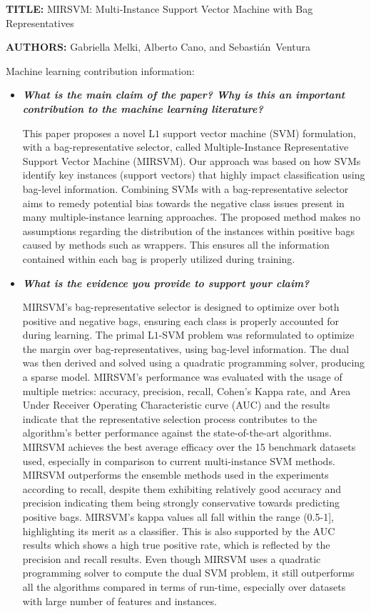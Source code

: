 \documentclass[a4paper,notitlepage]{article}
\begin{document}
\noindent \textbf{\small TITLE:} {\small MIRSVM: Multi-Instance Support Vector Machine with Bag Representatives}

\noindent \textbf{\small AUTHORS:} {\small Gabriella Melki, Alberto Cano, and Sebasti\'{a}n~Ventura}

\bigskip

\noindent Machine learning contribution information:

\begin{itemize}
\item \textbf{\textit{What is the main claim of the paper? Why is this an important contribution to the machine learning literature?}}

This paper proposes a novel L$1$ support vector machine (SVM) formulation, with a bag-representative selector, called Multiple-Instance Representative Support Vector Machine (MIRSVM). Our approach was based on how SVMs identify key instances (support vectors) that highly impact classification using bag-level information. Combining SVMs with a bag-representative selector aims to remedy potential bias towards the negative class issues present in many multiple-instance learning approaches. The proposed method makes no assumptions regarding the distribution of the instances within positive bags caused by methods such as wrappers. This ensures all the information contained within each bag is properly utilized during training.

\item \textbf{\textit{What is the evidence you provide to support your claim?}}

MIRSVM's bag-representative selector is designed to optimize over both positive and negative bags, ensuring each class is properly accounted for during learning. The primal L$1$-SVM problem was reformulated to optimize the margin over bag-representatives, using bag-level information. The dual was then derived and solved using a quadratic programming solver, producing a sparse model. MIRSVM's performance was evaluated with the usage of multiple metrics: accuracy, precision, recall, Cohen's Kappa rate, and Area Under Receiver Operating Characteristic curve (AUC) and the results indicate that the representative selection process contributes to the algorithm's better performance against the state-of-the-art algorithms. MIRSVM achieves the best average efficacy over the 15 benchmark datasets used, especially in comparison to current multi-instance SVM methods. MIRSVM outperforms the ensemble methods used in the experiments according to recall, despite them exhibiting relatively good accuracy and precision indicating them being strongly conservative towards predicting positive bags. MIRSVM's kappa values all fall within the range (0.5-1], highlighting its merit as a classifier. This is also supported by the AUC results which shows a high true positive rate, which is reflected by the precision and recall results. Even though MIRSVM uses a quadratic programming solver to compute the dual SVM problem, it still outperforms all the algorithms compared in terms of run-time, especially over datasets with large number of features and instances.


\end{itemize}
\end{document}

